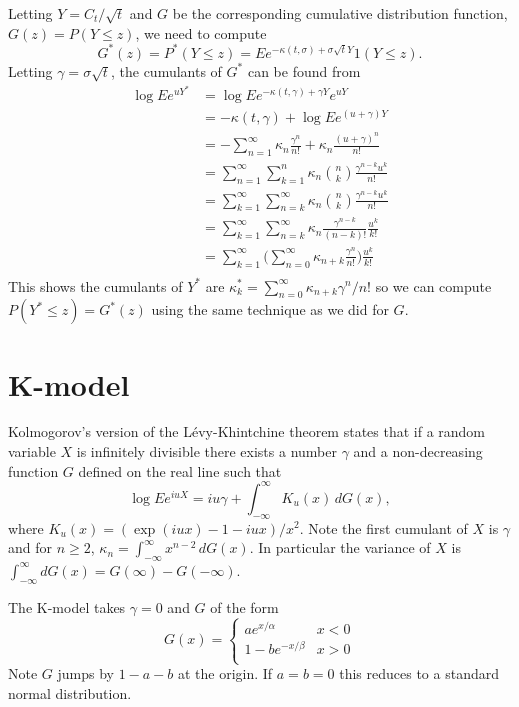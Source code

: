 \documentclass[11pt]{article}
\begin{document}
Letting \(Y = C_t/\sqrt{t}\) and \(G\) be the corresponding cumulative
distribution function, \(G(z) = P(Y\le z)\), we need to compute
\[
G^*(z) = P^*(Y\le z) = Ee^{-\kappa(t,\sigma) + \sigma\sqrt{t}Y}1(Y\le z).
\]
Letting \(\gamma = \sigma\sqrt{t}\), the cumulants of \(G^*\) can be found from
\begin{align*}
\log E e^{uY^*} &= \log E e^{-\kappa(t,\gamma) + \gamma Y} e^{uY}\\
&= -\kappa(t, \gamma) + \log E e^{(u + \gamma) Y}\\
&= -\sum_{n=1}^\infty \kappa_n \frac{\gamma^n}{n!} 
	+ \kappa_n \frac{(u + \gamma)^n}{n!}\\
&= \sum_{n=1}^\infty \sum_{k=1}^n \kappa_n \binom{n}{k}
	\frac{\gamma^{n - k}u^k}{n!}\\
&= \sum_{k=1}^\infty \sum_{n=k}^\infty \kappa_n 
	\binom{n}{k}\frac{\gamma^{n - k}u^k}{n!}\\
&= \sum_{k=1}^\infty \sum_{n=k}^\infty \kappa_n \frac{\gamma^{n-k}}{(n-k)!}
	\frac{u^k}{k!}\\
&= \sum_{k=1}^\infty 
	\bigl(\sum_{n=0}^\infty \kappa_{n+k} \frac{\gamma^n}{n!}\bigr)
	\frac{u^k}{k!}\\
\end{align*}
This shows the cumulants of \(Y^*\) are 
\(\kappa^*_k = \sum_{n=0}^\infty \kappa_{n + k}\gamma^n/n!\)
so we can compute \(P(Y^* \le z) = G^*(z)\) using the same
technique as we did for \(G\).
%
%
\section{K-model}
Kolmogorov's version of the L\'evy-Khintchine theorem\cite{?}
states that if a random variable \(X\) is infinitely divisible
there exists a number \(\gamma\) and a non-decreasing function
\(G\) defined on the real line such that
\[
\log Ee^{iuX} = iu\gamma + \int_{-\infty}^\infty K_u(x)\,dG(x),
\]
where \(K_u(x) = (\exp(iux) - 1 - iux)/x^2\). Note the first
cumulant of \(X\) is \(\gamma\) and for \(n\ge 2\),
\(\kappa_n = \int_{-\infty}^\infty x^{n-2}\,dG(x)\). In particular
the variance of \(X\) is 
\(\int_{-\infty}^\infty dG(x) = G(\infty) - G(-\infty)\).

The K-model takes \(\gamma = 0\) and \(G\) of the form
\[
G(x) =
\begin{cases}
a e^{x/\alpha} &x < 0\\
1 - be^{-x/\beta} & x > 0\\
\end{cases}
\]
Note \(G\) jumps by \(1 - a - b\) at the origin. If \(a = b = 0\)
this reduces to a standard normal distribution.
\end{document}
